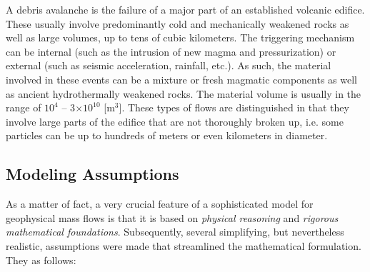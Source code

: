 \documentclass{article}
\begin{document}
A debris avalanche is the failure of a major part of an established volcanic edifice. These usually involve predominantly cold and mechanically weakened rocks as well as large volumes, up to tens of cubic kilometers. The triggering mechanism can be internal (such as the intrusion of new magma and pressurization) or external (such as seismic acceleration, rainfall, etc.). As such, the material involved in these events can be a mixture or fresh magmatic components as well as ancient hydrothermally weakened rocks. The material volume is usually in the range of $10^4$ -- 3$\times10^{10}$ [$\mathrm{m^3}$]. These types of flows are distinguished in that they involve large parts of the edifice that are not thoroughly broken up, i.e. some particles can be up to hundreds of meters or even kilometers in diameter.

\subsection{Modeling Assumptions}\label{subsec:ModelAssump}
As a matter of fact, a very crucial feature of a sophisticated model for geophysical mass flows is that it is based on \textit{physical reasoning} and \textit{rigorous mathematical foundations}. Subsequently, several simplifying, but nevertheless realistic, assumptions were made that streamlined the mathematical formulation. They as follows:
\end{document}
